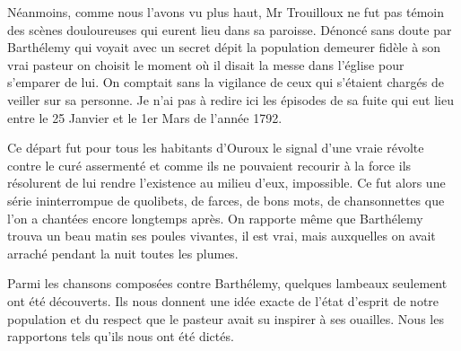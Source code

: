 Néanmoins, comme nous l'avons vu plus haut, Mr Trouilloux ne fut pas témoin des scènes douloureuses qui eurent lieu dans sa paroisse. Dénoncé sans doute par Barthélemy qui voyait avec un secret dépit la population demeurer fidèle à son vrai pasteur on choisit le moment où il disait la messe dans l'église pour s'emparer de lui. On comptait sans la vigilance de ceux qui s'étaient chargés de veiller sur sa personne. Je n'ai pas à redire ici les épisodes de sa fuite qui eut lieu entre le 25 Janvier et le 1er Mars de l'année 1792.

Ce départ fut pour tous les habitants d'Ouroux le signal d'une vraie révolte contre le curé assermenté et comme ils ne pouvaient recourir à la force ils résolurent de lui rendre l'existence au milieu d'eux, impossible. Ce fut alors une série ininterrompue de quolibets, de farces, de bons mots, de chansonnettes que l'on a chantées encore longtemps après. On rapporte même que Barthélemy trouva un beau matin ses poules vivantes, il est vrai, mais auxquelles on avait arraché pendant la nuit toutes les plumes.

Parmi les chansons composées contre Barthélemy, quelques lambeaux seulement ont été découverts. Ils nous donnent une idée exacte de
l'état d'esprit de notre population et du respect que le pasteur avait su inspirer à ses ouailles. Nous les rapportons tels qu'ils nous ont été dictés.

